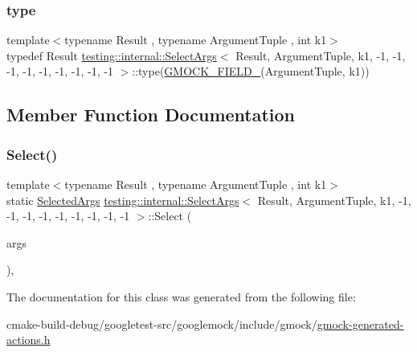 \subsubsection{\texorpdfstring{type}{type}}
{\footnotesize\ttfamily template$<$typename Result , typename Argument\+Tuple , int k1$>$ \\
typedef Result \mbox{\hyperlink{classtesting_1_1internal_1_1SelectArgs}{testing\+::internal\+::\+Select\+Args}}$<$ Result, Argument\+Tuple, k1, -\/1, -\/1, -\/1, -\/1, -\/1, -\/1, -\/1, -\/1, -\/1 $>$\+::type(\mbox{\hyperlink{gmock-generated-actions_8h_a6eb3ce92b0613603057a20ec9e593317}{G\+M\+O\+C\+K\+\_\+\+F\+I\+E\+L\+D\+\_\+}}(Argument\+Tuple, k1))}



\subsection{Member Function Documentation}
\mbox{\label{classtesting_1_1internal_1_1SelectArgs_3_01Result_00_01ArgumentTuple_00_01k1_00_01-1_00_01-1_00_6a5fc7802a60cf36c89bd10623cc9552_a7aaf6f5192da4e05fbc2bf595418546b}} 
\subsubsection{\texorpdfstring{Select()}{Select()}}
{\footnotesize\ttfamily template$<$typename Result , typename Argument\+Tuple , int k1$>$ \\
static \mbox{\hyperlink{classtesting_1_1internal_1_1SelectArgs_3_01Result_00_01ArgumentTuple_00_01k1_00_01-1_00_01-1_00_6a5fc7802a60cf36c89bd10623cc9552_a40e5cbd362d7bdd16d0d60a39b7e5c14}{Selected\+Args}} \mbox{\hyperlink{classtesting_1_1internal_1_1SelectArgs}{testing\+::internal\+::\+Select\+Args}}$<$ Result, Argument\+Tuple, k1, -\/1, -\/1, -\/1, -\/1, -\/1, -\/1, -\/1, -\/1, -\/1 $>$\+::Select (\begin{DoxyParamCaption}\item[{const Argument\+Tuple \&}]{args }\end{DoxyParamCaption})\hspace{0.3cm}{\ttfamily [inline]}, {\ttfamily [static]}}



The documentation for this class was generated from the following file\+:\begin{DoxyCompactItemize}
\item 
cmake-\/build-\/debug/googletest-\/src/googlemock/include/gmock/\mbox{\hyperlink{gmock-generated-actions_8h}{gmock-\/generated-\/actions.\+h}}\end{DoxyCompactItemize}

